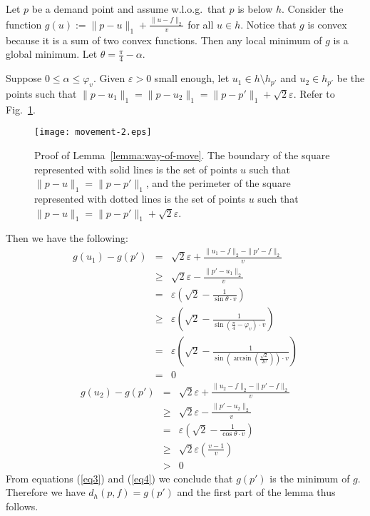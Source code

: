 \documentclass[11pt,a4paper,oneside,onecolumn]{article}
\def\eps{\varepsilon}
\def\QED{\ensuremath{{\square}}}
\def\markatright#1{\leavevmode\unskip\nobreak\quad\hspace*{\fill}{#1}}
\newenvironment{proof}
{\begin{trivlist}\item[\hskip\labelsep{\bf Proof.}]}
{\markatright{\QED}\end{trivlist}}
\begin{document}
\begin{proof}
Let $p$ be a demand point and assume w.l.o.g.\ that $p$ is below
$h$. Consider the function $g(u):=\|p-u\|_1+\frac{\|u-f\|_2}{v}$ for
all $u\in h$. Notice that $g$ is convex because it is a sum of two
convex functions. Then any local minimum of $g$ is a global minimum.
Let $\theta=\frac{\pi}{4}-\alpha$.

Suppose $0\leq\alpha\leq\varphi_v$. Given $\eps>0$ small enough, let
$u_1\in h\setminus h_{p'}$ and $u_2\in h_{p'}$ be the points such that
$\|p-u_1\|_1=\|p-u_2\|_1=\|p-p'\|_1+\sqrt{2}\eps$. Refer to
Fig.~\ref{fig:movement-2}.
\begin{figure}[h]
  \centering
  \texttt{[image: movement-2.eps]}
  \caption{\small{Proof of Lemma~\ref{lemma:way-of-move}. The boundary of the square
    represented with solid lines is the set of points $u$ such that
    $\|p-u\|_1=\|p-p'\|_1$, and the perimeter of the square represented with dotted
    lines is the set of points $u$ such that $\|p-u\|_1=\|p-p'\|_1+\sqrt{2}\eps$.}}
  \label{fig:movement-2}
\end{figure}

Then we have the following:
\begin{eqnarray}
\nonumber
g(u_1)-g(p') & = & \sqrt{2}\eps +\frac{\|u_1-f\|_2-\|p'-f\|_2}{v}\\
\nonumber
  & \geq & \sqrt{2}\eps -\frac{\|p'-u_1\|_2}{v} \\
\nonumber
  &=& \eps\left(\sqrt{2} -\frac{1}{\sin\theta \cdot v}\right)\\
\nonumber
 & \geq & \eps\left(\sqrt{2} -\frac{1}{\sin(\frac{\pi}{4}-\varphi_v) \cdot v}\right)\\
\nonumber
 & = & \eps\left(\sqrt{2}
\nonumber
-\frac{1}{\sin\left(\arcsin\left(\frac{\sqrt{2}}{2v}\right)\right) \cdot  v}\right)\\
  & = & 0\label{eq3}
\end{eqnarray}
\begin{eqnarray}
\nonumber
g(u_2)-g(p') & = & \sqrt{2}\eps +\frac{\|u_2-f\|_2-\|p'-f\|_2}{v}\\
\nonumber
  & \geq & \sqrt{2}\eps -\frac{\|p'-u_2\|_2}{v} \\
\nonumber
  &   =  & \eps\left(\sqrt{2} -\frac{1}{\cos\theta \cdot v}\right)\\
\nonumber
 & \geq & \sqrt{2}\eps\left(\frac{v-1}{v}\right) \\
  & > & 0\label{eq4}
\end{eqnarray}
From equations (\ref{eq3}) and (\ref{eq4}) we conclude that $g(p')$
is the minimum of $g$. Therefore we have $d_h(p,f)=g(p')$ and the
first part of the lemma thus follows.


\end{proof}
\end{document}
